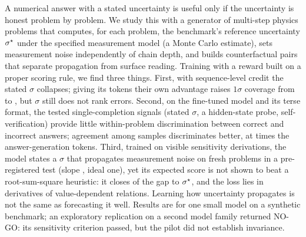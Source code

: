 A numerical answer with a stated uncertainty is useful only if the uncertainty is honest problem by problem.
We study this with a generator of multi-step physics problems that computes, for each problem, the benchmark's reference uncertainty
$\sigma^{\star}$ under the specified measurement model (a Monte Carlo estimate),
sets measurement noise independently of chain depth, and builds counterfactual pairs that separate propagation from
surface reading.
Training  with a reward built on a proper scoring rule, we find three things.
First, with sequence-level credit the stated $\sigma$ collapses; giving its tokens their own advantage raises
$1\sigma$ coverage from  to , but $\sigma$ still does not rank errors.
Second, on the fine-tuned model and its terse format, the tested single-completion signals (stated $\sigma$, a
hidden-state probe, self-verification) provide little within-problem discrimination between correct and incorrect
answers; agreement among samples discriminates better, at  times the answer-generation tokens.
Third, trained on visible sensitivity derivations, the model states a $\sigma$ that propagates measurement noise on
fresh problems in a pre-registered test (slope , ideal one), yet its expected score is not shown to beat a
root-sum-square heuristic: it closes  of the gap to $\sigma^{\star}$, and the loss lies in derivatives of
value-dependent relations.
Learning how uncertainty propagates is not the same as forecasting it well.
Results are for one small model on a synthetic benchmark; an exploratory replication on a second model family returned
NO-GO: its sensitivity criterion passed, but the pilot did not establish invariance.

